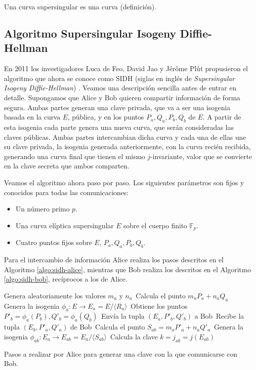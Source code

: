\documentclass[
  a4paper,
  12pt,
  spanish,
]{scrartcl}
\begin{document}
Una curva supersingular es una curva (definición).

\subsection{Algoritmo Supersingular Isogeny Diffie-Hellman}

En 2011 los investigadores Luca de Feo, David Jao y Jérôme Plût propusieron el algoritmo que ahora se conoce como SIDH (siglas en inglés de \textit{Supersingular Isogeny Diffie-Hellman}) \parencite{yang_towards_2011}.
Veamos una descripción sencilla antes de entrar en detalle. 
Supongamos que Alice y Bob quieren compartir información de forma segura.
Ambas partes generan una clave privada, que va a ser una isogenia basada en la curva \(E\), pública, y en los puntos \(P_a, Q_a, P_b, Q_b\) de \(E\). 
A partir de esta isogenia cada parte genera una nueva curva, que serán consideradas las claves públicas.
Ambas partes intercambian dicha curva y cada una de ellas une su clave privada, la isogenia generada anteriormente, con la curva recién recibida, generando una
curva final que tienen el mismo \(j\)-invariante, valor que se convierte en la clave secreta que ambos comparten.

Veamos el algoritmo ahora paso por paso. Los siguientes parámetros son fijos y conocidos para todas las comunicaciones:
\begin{itemize}
  \item Un número primo \(p\).
  \item Una curva elíptica supersingular \(E\) sobre el cuerpo finito \(\mathbb F_p\).
  \item Cuatro puntos fijos sobre \(E\), \(P_a, Q_a, P_b, Q_b\).
\end{itemize}
Para el intercambio de información Alice realiza los pasos descritos en el Algoritmo \ref{algo:sidh-alice}, mientras que Bob realiza los descritos en el Algoritmo \ref{algo:sidh-bob}, recíprocos a los de Alice.

\begin{algorithm}[h]
  Genera aleatoriamente los valores \(m_a\) y \(n_a\)\,\;
  Calcula el punto \(m_aP_a + n_aQ_a\)\,\;
  Genera la isogenia \(\phi_a: E \to E_a = E/\langle R_a \rangle\)\,\;
  Obtiene los puntos \(P'_b = \phi_a(P_b), Q'_b = \phi_a(Q_b)\)\,\;
  Envía la tupla \((E_a, P'_b, Q'_b)\) a Bob\,\;
  Recibe la tupla \((E_b, P'_a, Q'_a)\) de Bob\,\;
  Calcula el punto \(S_{ab} = m_aP'_a + n_aQ'_a\)\,\;
  Genera la isogenia \(\phi_{ab} : E_a \to E_{ab} = E_a/\langle S_{ab} \rangle\)\,\;
  Calcula la clave \(k = j_{ab} = j(E_{ab})\)\,\;
  
  \caption{Pasos a realizar por Alice para generar una clave con la que comunicarse con Bob.}
  \label{algo:sidh-alice}
\end{algorithm}
\end{document}
